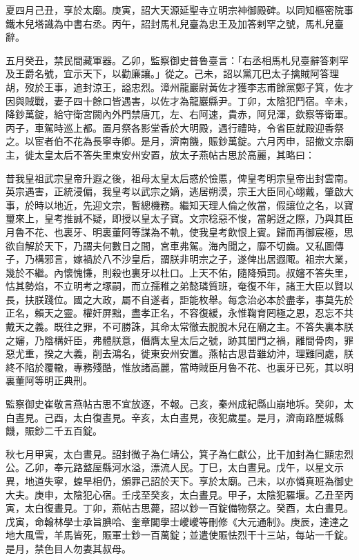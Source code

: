 \begin{pinyinscope}
 夏四月己丑，享於太廟。庚寅，詔大天源延聖寺立明宗神御殿碑。以同知樞密院事鐵木兒塔識為中書右丞。丙午，詔封馬札兒臺為忠王及加答剌罕之號，馬札兒臺辭。



 五月癸丑，禁民間藏軍器。乙卯，監察御史普魯臺言：「右丞相馬札兒臺辭答剌罕及王爵名號，宜示天下，以勸廉讓。」從之。己未，詔以黨兀巴太子擒賊阿答理胡，歿於王事，追封涼王，謚忠烈。漳州龍巖尉黃佐才獲李志甫餘黨鄭子箕，佐才因與賊戰，妻子四十餘口皆遇害，以佐才為龍巖縣尹。丁卯，太陰犯鬥宿。辛未，降鈔萬錠，給守衛宮闕內外門禁唐兀，左、右阿速，貴赤，阿兒渾，欽察等衛軍。丙子，車駕時巡上都。置月祭各影堂香於大明殿，遇行禮時，令省臣就殿迎香祭之。以宦者伯不花為長寧寺卿。是月，濟南饑，賑鈔萬錠。六月丙申，詔撤文宗廟主，徙太皇太后不答失里東安州安置，放太子燕帖古思於高麗，其略曰：



 昔我皇祖武宗皇帝升遐之後，祖母太皇太后惑於憸慝，俾皇考明宗皇帝出封雲南。英宗遇害，正統浸偏，我皇考以武宗之嫡，逃居朔漠，宗王大臣同心翊戴，肇啟大事，於時以地近，先迎文宗，暫總機務。繼知天理人倫之攸當，假讓位之名，以寶璽來上，皇考推誠不疑，即授以皇太子寶。文宗稔惡不悛，當躬迓之際，乃與其臣月魯不花、也裏牙、明裏董阿等謀為不軌，使我皇考飲恨上賓。歸而再御宸極，思欲自解於天下，乃謂夫何數日之間，宮車弗駕。海內聞之，靡不切齒。又私圖傳子，乃構邪言，嫁禍於八不沙皇后，謂朕非明宗之子，遂俾出居遐陬。祖宗大業，幾於不繼。內懷愧慊，則殺也裏牙以杜口。上天不佑，隨降殞罰。叔嬸不答失里，怙其勢焰，不立明考之塚嗣，而立孺稚之弟懿璘質班，奄復不年，諸王大臣以賢以長，扶朕踐位。國之大政，屬不自遂者，詎能枚舉。每念治必本於盡孝，事莫先於正名，賴天之靈。權奸屏黜，盡孝正名，不容復緩，永惟鞠育罔極之恩，忍忘不共戴天之義。既往之罪，不可勝誅，其命太常徹去脫脫木兒在廟之主。不答失裏本朕之嬸，乃陰構奸臣，弗體朕意，僭膺太皇太后之號，跡其閨門之禍，離間骨肉，罪惡尤重，揆之大義，削去鴻名，徙東安州安置。燕帖古思昔雖幼沖，理難同處，朕終不陷於覆轍，專務殘酷，惟放諸高麗，當時賊臣月魯不花、也裏牙已死，其以明裏董阿等明正典刑。



 監察御史崔敬言燕帖古思不宜放逐，不報。己亥，秦州成紀縣山崩地坼。癸卯，太白晝見。己酉，太白復晝見。辛亥，太白晝見，夜犯歲星。是月，濟南路歷城縣饑，賑鈔二千五百錠。



 秋七月甲寅，太白晝見。詔封微子為仁靖公，箕子為仁獻公，比干加封為仁顯忠烈公。乙卯，奉元路盩厔縣河水溢，漂流人民。丁巳，太白晝見。戊午，以星文示異，地道失寧，蝗旱相仍，頒罪己詔於天下。享於太廟。己未，以亦憐真班為御史大夫。庚申，太陰犯心宿。壬戌至癸亥，太白晝見。甲子，太陰犯羅堰。乙丑至丙寅，太白復晝見。丁卯，燕帖古思薨，詔以鈔一百錠備物祭之。癸酉，太白晝見。戊寅，命翰林學士承旨腆哈、奎章閣學士巙巙等刪修《大元通制》。庚辰，達達之地大風雪，羊馬皆死，賑軍士鈔一百萬錠；並遣使賑怯烈干十三站，每站一千錠。是月，禁色目人勿妻其叔母。




\end{pinyinscope}
